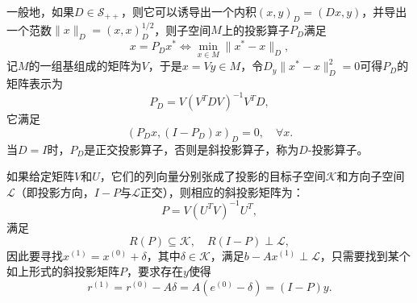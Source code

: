 \documentclass[a4paper,10pt]{ctexart}
\begin{document}
一般地，如果$ D\in \mathcal{S}_{++} $，则它可以诱导出一个内积$ (x,y)_D = (Dx,y) $，并导出一个范数$ \| x \|_D = (x,x)_D^{1 / 2} $，则子空间$ M $上的投影算子$ P_D $满足
\begin{equation}
    x = P_D x^* \iff \min_{x\in M} \| x^* - x \|_D,
\end{equation}
记$ M $的一组基组成的矩阵为$ V $，于是$ x=Vy\in M $，令$ D_y\| x^* - x \|_D^2=0 $可得$ P_D $的矩阵表示为
\begin{equation}
    P_D = V(V^TDV)^{-1}V^TD,
\end{equation}
它满足
\begin{equation}
    (P_Dx, (I-P_D)x)_D = 0,\quad \forall x.
\end{equation}
当$ D = I $时，$ P_D $是正交投影算子，否则是斜投影算子，称为$ D $-投影算子。

如果给定矩阵$ V $和$ U $，它们的列向量分别张成了投影的目标子空间$ \mathcal{K} $和方向子空间$ \mathcal{L} $（即投影方向，$ I-P $与$ \mathcal{L} $正交），则相应的斜投影矩阵为：
\begin{equation}
    P = V(U^TV)^{-1}U^T,
\end{equation}
满足
\[
    R(P)\subseteq \mathcal{K},\quad R(I-P)\perp \mathcal{L},
\]
因此要寻找$ x^{(1)} = x^{(0)} + \delta $，其中$ \delta\in \mathcal{K} $，满足$ b-Ax^{(1)}\perp \mathcal{L} $，只需要找到某个如上形式的斜投影矩阵$ P $，要求存在$ y $使得
\[
    r^{(1)} = r^{(0)} -A \delta = A(e^{(0)}-\delta) = (I-P)y.
\]
\end{document}
